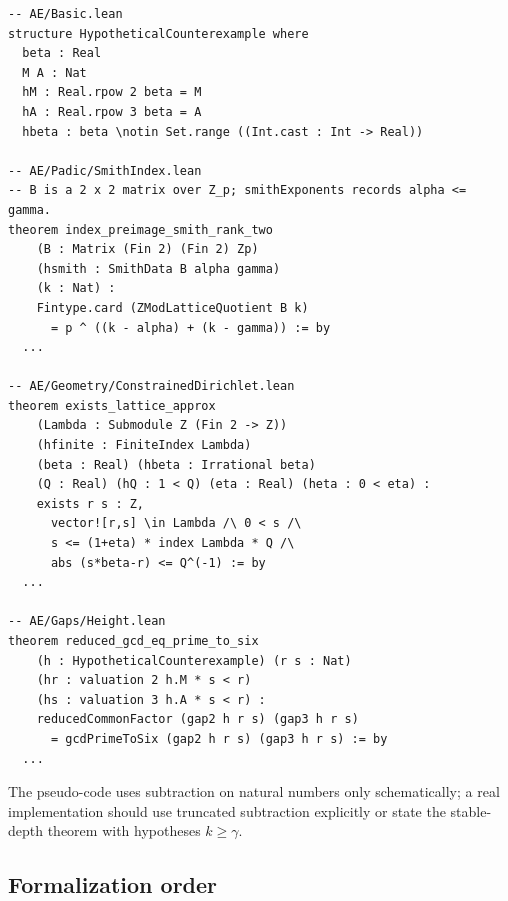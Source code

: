 \documentclass[11pt,oneside]{article}
\theoremstyle{definition}
\begin{document}
\begin{lstlisting}[style=pythonstyle,language={},caption={Proposed Lean interfaces for the elementary core.}]
-- AE/Basic.lean
structure HypotheticalCounterexample where
  beta : Real
  M A : Nat
  hM : Real.rpow 2 beta = M
  hA : Real.rpow 3 beta = A
  hbeta : beta \notin Set.range ((Int.cast : Int -> Real))

-- AE/Padic/SmithIndex.lean
-- B is a 2 x 2 matrix over Z_p; smithExponents records alpha <= gamma.
theorem index_preimage_smith_rank_two
    (B : Matrix (Fin 2) (Fin 2) Zp)
    (hsmith : SmithData B alpha gamma)
    (k : Nat) :
    Fintype.card (ZModLatticeQuotient B k)
      = p ^ ((k - alpha) + (k - gamma)) := by
  ...

-- AE/Geometry/ConstrainedDirichlet.lean
theorem exists_lattice_approx
    (Lambda : Submodule Z (Fin 2 -> Z))
    (hfinite : FiniteIndex Lambda)
    (beta : Real) (hbeta : Irrational beta)
    (Q : Real) (hQ : 1 < Q) (eta : Real) (heta : 0 < eta) :
    exists r s : Z,
      vector![r,s] \in Lambda /\ 0 < s /\
      s <= (1+eta) * index Lambda * Q /\
      abs (s*beta-r) <= Q^(-1) := by
  ...

-- AE/Gaps/Height.lean
theorem reduced_gcd_eq_prime_to_six
    (h : HypotheticalCounterexample) (r s : Nat)
    (hr : valuation 2 h.M * s < r)
    (hs : valuation 3 h.A * s < r) :
    reducedCommonFactor (gap2 h r s) (gap3 h r s)
      = gcdPrimeToSix (gap2 h r s) (gap3 h r s) := by
  ...
\end{lstlisting}

The pseudo-code uses subtraction on natural numbers only schematically;
a real implementation should use truncated subtraction explicitly or
state the stable-depth theorem with hypotheses $k\ge\gamma$.

\subsection{Formalization order}
\end{document}
